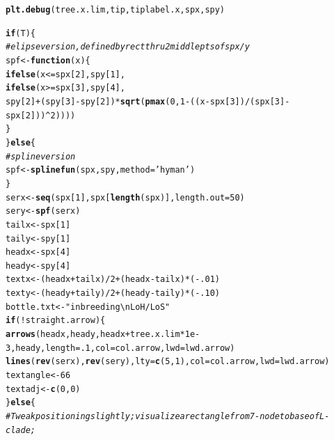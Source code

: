 \documentclass{article}\usepackage[]{graphicx}\usepackage[]{color}
\makeatletter
\newcommand{\hlnum}[1]{\textcolor[rgb]{0.686,0.059,0.569}{#1}}%
\newcommand{\hlstr}[1]{\textcolor[rgb]{0.192,0.494,0.8}{#1}}%
\newcommand{\hlcom}[1]{\textcolor[rgb]{0.678,0.584,0.686}{\textit{#1}}}%
\newcommand{\hlopt}[1]{\textcolor[rgb]{0,0,0}{#1}}%
\newcommand{\hlstd}[1]{\textcolor[rgb]{0.345,0.345,0.345}{#1}}%
\newcommand{\hlkwa}[1]{\textcolor[rgb]{0.161,0.373,0.58}{\textbf{#1}}}%
\newcommand{\hlkwb}[1]{\textcolor[rgb]{0.69,0.353,0.396}{#1}}%
\newcommand{\hlkwc}[1]{\textcolor[rgb]{0.333,0.667,0.333}{#1}}%
\newcommand{\hlkwd}[1]{\textcolor[rgb]{0.737,0.353,0.396}{\textbf{#1}}}%
\newenvironment{kframe}{%
 \def\at@end@of@kframe{}%
 \ifinner\ifhmode%
  \def\at@end@of@kframe{\end{minipage}}%
  \begin{minipage}{\columnwidth}%
 \fi\fi%
 \def\FrameCommand##1{\hskip\@totalleftmargin \hskip-\fboxsep
 \colorbox{shadecolor}{##1}\hskip-\fboxsep
     \hskip-\linewidth \hskip-\@totalleftmargin \hskip\columnwidth}%
 \MakeFramed {\advance\hsize-\width
   \@totalleftmargin\z@ \linewidth\hsize
   \@setminipage}}%
 {\par\unskip\endMakeFramed%
 \at@end@of@kframe}
\newenvironment{knitrout}{}{} %
\makeatother
\begin{document}
\begin{knitrout}
\begin{kframe}
\begin{alltt}
  \hlkwd{plt.debug}\hlstd{(tree.x.lim, tip, tiplabel.x, spx, spy)}

  \hlkwa{if}\hlstd{(T)\{}
    \hlcom{#elipse version, defined by rect thru 2 middle pts of spx/y}
    \hlstd{spf}\hlkwb{<-}\hlkwa{function}\hlstd{(}\hlkwc{x}\hlstd{)\{}
      \hlkwd{ifelse}\hlstd{(x} \hlopt{<=} \hlstd{spx[}\hlnum{2}\hlstd{], spy[}\hlnum{1}\hlstd{],}
             \hlkwd{ifelse}\hlstd{(x} \hlopt{>=} \hlstd{spx[}\hlnum{3}\hlstd{], spy[}\hlnum{4}\hlstd{],}
                    \hlstd{spy[}\hlnum{2}\hlstd{]}\hlopt{+}\hlstd{(spy[}\hlnum{3}\hlstd{]}\hlopt{-}\hlstd{spy[}\hlnum{2}\hlstd{])}\hlopt{*}\hlkwd{sqrt}\hlstd{(}\hlkwd{pmax}\hlstd{(}\hlnum{0}\hlstd{,}\hlnum{1}\hlopt{-}\hlstd{((x}\hlopt{-}\hlstd{spx[}\hlnum{3}\hlstd{])}\hlopt{/}\hlstd{(spx[}\hlnum{3}\hlstd{]}\hlopt{-}\hlstd{spx[}\hlnum{2}\hlstd{]))}\hlopt{^}\hlnum{2}\hlstd{))))}
      \hlstd{\}}
  \hlstd{\}} \hlkwa{else} \hlstd{\{}
    \hlcom{# spline version}
    \hlstd{spf} \hlkwb{<-} \hlkwd{splinefun}\hlstd{(spx,spy,}\hlkwc{method}\hlstd{=}\hlstr{'hyman'}\hlstd{)}
  \hlstd{\}}
  \hlstd{serx} \hlkwb{<-} \hlkwd{seq}\hlstd{(spx[}\hlnum{1}\hlstd{],spx[}\hlkwd{length}\hlstd{(spx)],}\hlkwc{length.out}\hlstd{=}\hlnum{50}\hlstd{)}
  \hlstd{sery} \hlkwb{<-} \hlkwd{spf}\hlstd{(serx)}
  \hlstd{tailx} \hlkwb{<-} \hlstd{spx[}\hlnum{1}\hlstd{]}
  \hlstd{taily} \hlkwb{<-} \hlstd{spy[}\hlnum{1}\hlstd{]}
  \hlstd{headx} \hlkwb{<-} \hlstd{spx[}\hlnum{4}\hlstd{]}
  \hlstd{heady} \hlkwb{<-} \hlstd{spy[}\hlnum{4}\hlstd{]}
  \hlstd{textx} \hlkwb{<-} \hlstd{(headx}\hlopt{+}\hlstd{tailx)}\hlopt{/}\hlnum{2}\hlopt{+}\hlstd{(headx}\hlopt{-}\hlstd{tailx)}\hlopt{*}\hlstd{(}\hlopt{-}\hlnum{.01}\hlstd{)}
  \hlstd{texty} \hlkwb{<-} \hlstd{(heady}\hlopt{+}\hlstd{taily)}\hlopt{/}\hlnum{2}\hlopt{+}\hlstd{(heady}\hlopt{-}\hlstd{taily)}\hlopt{*}\hlstd{(}\hlopt{-}\hlnum{.10}\hlstd{)}
  \hlstd{bottle.txt} \hlkwb{<-} \hlstr{"inbreeding\textbackslash{}nLoH / LoS"}
  \hlkwa{if}\hlstd{(}\hlopt{!}\hlstd{straight.arrow)\{}
    \hlkwd{arrows}\hlstd{(headx,heady,headx}\hlopt{+}\hlstd{tree.x.lim}\hlopt{*}\hlnum{1e-3}\hlstd{,heady,} \hlkwc{length}\hlstd{=}\hlnum{.1}\hlstd{,}\hlkwc{col}\hlstd{=col.arrow,}\hlkwc{lwd}\hlstd{=lwd.arrow)}
    \hlkwd{lines}\hlstd{(}\hlkwd{rev}\hlstd{(serx),} \hlkwd{rev}\hlstd{(sery),} \hlkwc{lty}\hlstd{=}\hlkwd{c}\hlstd{(}\hlnum{5}\hlstd{,}\hlnum{1}\hlstd{),}\hlkwc{col}\hlstd{=col.arrow,} \hlkwc{lwd}\hlstd{=lwd.arrow)}
    \hlstd{textangle} \hlkwb{<-} \hlnum{66}
    \hlstd{textadj} \hlkwb{<-} \hlkwd{c}\hlstd{(}\hlnum{0}\hlstd{,}\hlnum{0}\hlstd{)}
  \hlstd{\}} \hlkwa{else} \hlstd{\{}
    \hlcom{# Tweak positioning slightly; visualize a rectangle from 7-node to base of L-clade;}

\end{alltt}
\end{kframe}
\end{knitrout}
\end{document}
